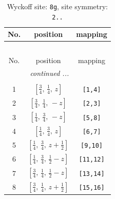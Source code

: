 \documentclass[fleqn,8pt]{jsarticle}
\begin{document}
\begin{longtable}{ccc}
\caption{Wyckoff site: {\tt 8g}, site symmetry: {\tt 2..}}
 \\
 \hline \hline
No. & position & mapping \\ \hline \endfirsthead

\multicolumn{2}{l}{\tablename\ \thetable{}} \\
 \hline \hline
No. & position & mapping \\ \hline \endhead

 \hline \hline
\multicolumn{2}{r}{\footnotesize\it continued ...} \\ \endfoot

 \hline \hline
\multicolumn{2}{r}{} \\ \endlastfoot

1 & $\left[ \frac{3}{4},\, \frac{1}{4},\, z \right]$ & {\tt [1,4]} \\ \hline
2 & $\left[ \frac{3}{4},\, \frac{1}{4},\, - z \right]$ & {\tt [2,3]} \\ \hline
3 & $\left[ \frac{1}{4},\, \frac{3}{4},\, - z \right]$ & {\tt [5,8]} \\ \hline
4 & $\left[ \frac{1}{4},\, \frac{3}{4},\, z \right]$ & {\tt [6,7]} \\ \hline
5 & $\left[ \frac{1}{4},\, \frac{3}{4},\, z + \frac{1}{2} \right]$ & {\tt [9,10]} \\ \hline
6 & $\left[ \frac{1}{4},\, \frac{3}{4},\, \frac{1}{2} - z \right]$ & {\tt [11,12]} \\ \hline
7 & $\left[ \frac{3}{4},\, \frac{1}{4},\, \frac{1}{2} - z \right]$ & {\tt [13,14]} \\ \hline
8 & $\left[ \frac{3}{4},\, \frac{1}{4},\, z + \frac{1}{2} \right]$ & {\tt [15,16]} \\
\end{longtable}
\renewcommand{\arraystretch}{1.2}
\end{document}
